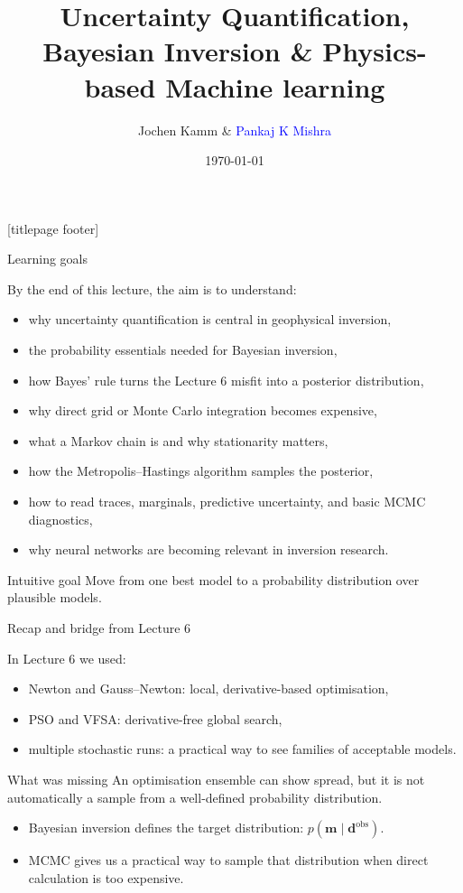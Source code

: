 \documentclass[aspectratio=169]{beamer}
\title{\LARGE\textbf{Uncertainty Quantification, Bayesian Inversion \& Physics-based Machine learning}}
\author{Jochen Kamm \& \textcolor{blue}{Pankaj K Mishra}}
\date{\footnotesize\today}
\renewcommand{\vec}[1]{\mathbf{#1}}
\newcommand{\dobs}{{\vec{d}^{\text{obs}}}}
\newcommand{\mm}{ {\vec{m}} }
\begin{document}
{
[titlepage footer]
\begin{frame}[plain]
    \titlepage
\end{frame}
}

\begin{frame}{Learning goals}
\small

By the end of this lecture, the aim is to understand:

\begin{itemize}
    \item[--] why uncertainty quantification is central in geophysical inversion,
    \item[--] the probability essentials needed for Bayesian inversion,
    \item[--] how Bayes' rule turns the Lecture 6 misfit into a posterior distribution,
    \item[--] why direct grid or Monte Carlo integration becomes expensive,
    \item[--] what a Markov chain is and why stationarity matters,
    \item[--] how the Metropolis--Hastings algorithm samples the posterior,
    \item[--] how to read traces, marginals, predictive uncertainty, and basic MCMC diagnostics,
    \item[--] why neural networks are becoming relevant in inversion research.
\end{itemize}

\begin{alertblock}{Intuitive goal}
Move from \alert{one best model} to a \alert{probability distribution over plausible models}.
\end{alertblock}
\end{frame}

\begin{frame}{Recap and bridge from Lecture 6}
\small

In Lecture 6 we used:
\begin{itemize}
    \item[--] Newton and Gauss--Newton: local, derivative-based optimisation,
    \item[--] PSO and VFSA: derivative-free global search,
    \item[--] multiple stochastic runs: a practical way to see families of acceptable models.
\end{itemize}

\begin{alertblock}{What was missing}
An optimisation ensemble can show spread, but it is not automatically a sample from a well-defined probability distribution.
\end{alertblock}

\begin{itemize}
    \item[--] Bayesian inversion defines the target distribution: $p(\mm\mid\dobs)$.
    \item[--] MCMC gives us a practical way to sample that distribution when direct calculation is too expensive.
\end{itemize}
\end{frame}
\end{document}
